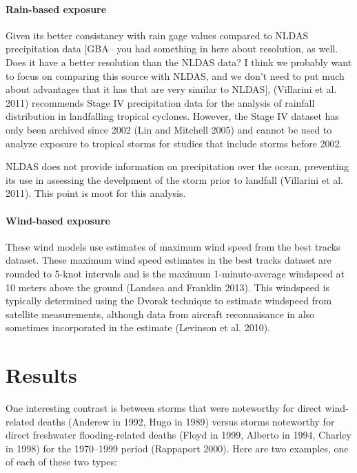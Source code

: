 \documentclass[]{elsarticle} %
\begin{document}
\paragraph{Rain-based exposure}\label{rain-based-exposure}

Given its better consistancy with rain gage values compared to NLDAS
precipitation data {[}GBA-- you had something in here about resolution,
as well. Does it have a better resolution than the NLDAS data? I think
we probably want to focus on comparing this source with NLDAS, and we
don't need to put much about advantages that it has that are very
similar to NLDAS{]}, (Villarini et al. 2011) recommends Stage IV
precipitation data for the analysis of rainfall distribution in
landfalling tropical cyclones. However, the Stage IV dataset has only
been archived since 2002 (Lin and Mitchell 2005) and cannot be used to
analyze exposure to tropical storms for studies that include storms
before 2002.

NLDAS does not provide information on precipitation over the ocean,
preventing its use in assessing the develpment of the storm prior to
landfall (Villarini et al. 2011). This point is moot for this analysis.

\paragraph{Wind-based exposure}\label{wind-based-exposure}

These wind models use estimates of maximum wind speed from the best
tracks dataset. These maximum wind speed estimates in the best tracks
dataset are rounded to 5-knot intervals and is the maximum
1-minute-average windspeed at 10 meters above the ground (Landsea and
Franklin 2013). This windspeed is typically determined using the Dvorak
technique to estimate windspeed from satellite measurements, although
data from aircraft reconnaisance in also sometimes incorporated in the
estimate (Levinson et al. 2010).

\section{Results}\label{results}

One interesting contrast is between storms that were noteworthy for
direct wind-related deaths (Anderew in 1992, Hugo in 1989) versus storms
noteworthy for direct freshwater flooding-related deaths (Floyd in 1999,
Alberto in 1994, Charley in 1998) for the 1970--1999 period (Rappaport
2000). Here are two examples, one of each of these two types:
\end{document}
